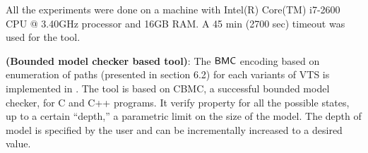 All the experiments were done
on a machine with Intel(R) Core(TM) i7-2600 CPU @ 3.40GHz processor and 16GB RAM.
%
A 45 min (2700 sec) timeout was used for the tool.

%

%

\textbf{{\sattool (Bounded model checker based tool)}}:
The $\mathsf{BMC}$ encoding based on enumeration of paths (presented in section 6.2) for each variants of VTS is implemented in {\sattool}.
The tool is based on CBMC, a successful bounded model checker, for C and C++ programs. 
%
%
It verify property for all the possible states, up to a certain “depth,” a parametric limit on the size of the model.
%
The depth of model is specified by the user and can be  incrementally increased to a desired value.
%
%

